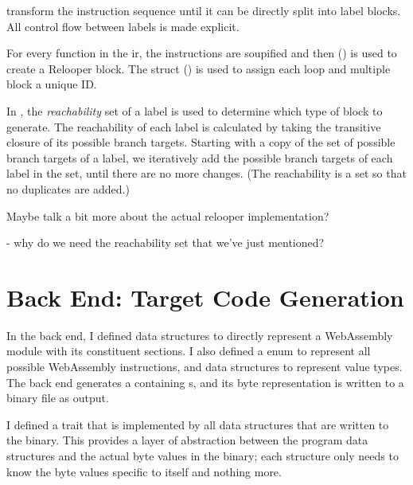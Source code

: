 \documentclass[00-main.tex]{subfiles}
\begin{document}
 transform the instruction sequence until it can be directly split into label blocks.
All control flow between labels is made explicit.

For every function in the \gls{ir}, the instructions are soupified and then  () is used to create a Relooper block.
The  struct () is used to assign each loop and multiple block a unique ID\@.

In , the \emph{reachability} set of a label is used to determine which type of block to generate.
The reachability of each label is calculated by taking the transitive closure of its possible branch targets.
Starting with a copy of the set of possible branch targets of a label, we iteratively add the possible branch targets of each label in the set, until there are no more changes.
(The reachability is a set so that no duplicates are added.)

\begin{mrwComment}
  Maybe talk a bit more about the actual relooper implementation?

  - why do we need the reachability set that we've just mentioned?
\end{mrwComment}

\section{Back End: Target Code Generation}

In the back end, I defined data structures to directly represent a WebAssembly module with its constituent sections.
I also defined a  enum to represent all possible WebAssembly instructions, and data structures to represent value types.
The back end generates a  containing s, and its byte representation is written to a binary file as output.

I defined a  trait that is implemented by all data structures that are written to the binary.
This provides a layer of abstraction between the program data structures and the actual byte values in the binary; each structure only needs to know the byte values specific to itself and nothing more.
\end{document}
